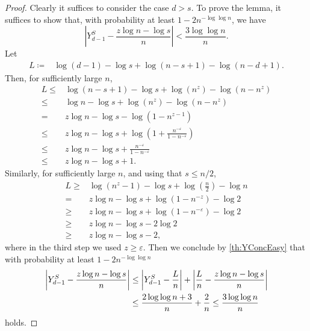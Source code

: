 \documentclass[a4paper,11pt]{article}
\theoremstyle{definition}
\theoremstyle{plain}
\let\eps\varepsilon
\DeclarePairedDelimiter{\abs}{\lvert}{\rvert}
\begin{document}
\begin{proof}
  Clearly it suffices to consider the case $d > s$.
  To prove the lemma, it suffices to show that, with probability at least $1 - 2n^{-\log\log n}$, we have
  \[
      \left| Y^S_{d-1} - \frac{z\log n - \log s}{n} \right|
      <
      \frac{3\log \log n}{n}.
  \]
  Let
  \begin{align*}
    L \coloneqq{}& \log (d -1) - \log s + \log (n -  s + 1) - \log(n - d + 1).
  \end{align*}
  Then, for sufficiently large $n$,
  \begin{align*}
    L\le{}& \log (n -  s + 1) - \log s + \log\left( n^z \right) - \log\left(n-n^z\right)
    \\ \le{}& \log n - \log s + \log\left( n^z \right) - \log\left(n-n^z\right)
    \\ ={}& z \log n  - \log s - \log\left(1-n^{z-1}\right)
    \\ \leq{}& z \log n  - \log s + \log\left(1+\frac{n^{-\eps}}{1 - n^{-\eps}}\right)
    \\ \le{}& z \log n  - \log s + \frac{n^{-\eps}}{1 - n^{-\eps}}
    \\ \le{}& z \log n - \log  s + 1.
  \end{align*}
  Similarly, for sufficiently large $n$, and using that $s\le n/2$,
  \begin{align*}
    L\ge{}& \log\left(n^z - 1\right) - \log s + \log \left(\frac{n}{2}\right) - \log n
    \\ ={}& z \log n  - \log  s + \log\left(1-n^{-z}\right) - \log 2
    \\ \ge {}& z \log n  - \log  s + \log\left(1-n^{-\eps}\right)- \log 2
    \\ \ge {}& z \log n  - \log  s - 2\log 2
    \\ \ge{}& z \log n - \log  s - 2,
  \end{align*}
  where in the third step we used $z\ge \eps$.
  Then we conclude by \cref{th:YConcEasy} that with probability at least $1 - 2n^{-\log\log n}$
  \begin{align*}
    \abs*{ Y^S_{d-1} - \frac{{z\log n - \log s}}{n}}
    &\leq
    \abs*{ Y^S_{d-1}- \frac{L}{n} }
    +
    \abs*{ \frac{L}{n} - \frac{z\log n - \log s}{n} }
    \\ &\leq
    \frac{2\log\log n + 3}{n} + \frac{2}{n}
    \le
    \frac{3\log \log n}{n}
  \end{align*}
  holds.
\end{proof}
\end{document}
